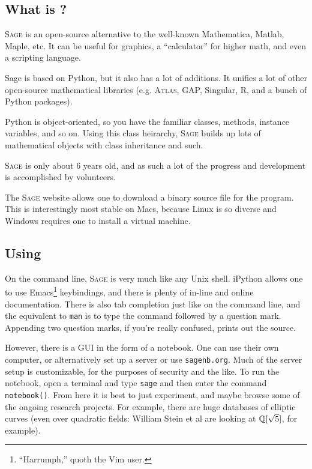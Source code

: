 \subsection{What is {}?}
\textsc{Sage} is an open-source alternative to the well-known Mathematica, Matlab, Maple, etc. It can be useful for graphics, a ``calculator'' for higher math, and even a scripting language.

Sage is based on Python, but it also has a lot of additions. It unifies a lot of other open-source mathematical libraries (e.g. \textsc{Atlas}, GAP, Singular, R, and a bunch of Python packages).

Python is object-oriented, so you have the familiar classes, methods, instance variables, and so on. Using this class heirarchy, \textsc{Sage} builds up lots of mathematical objects with class inheritance and such.

\textsc{Sage} is only about 6 years old, and as such a lot of the progress and development is accomplished by volunteers.

The \textsc{Sage} website allows one to download a binary source file for the program. This is interestingly most stable on Macs, because Linux is so diverse and Windows requires one to install a virtual machine.

\subsection{Using {}}
On the command line, \textsc{Sage} is very much like any Unix shell. iPython allows one to use Emacs\footnote{``Harrumph,'' quoth the Vim user.} keybindings, and there is plenty of in-line and online documentation. There is also tab completion just like on the command line, and the equivalent to \texttt{man} is to type the command followed by a question mark. Appending two question marks, if you're really confused, prints out the source.

However, there is a GUI in the form of a notebook. One can use their own computer, or alternatively set up a server or use \texttt{sagenb.org}. Much of the server setup is customizable, for the purposes of security and the like. To run the notebook, open a terminal and type \texttt{sage} and then enter the command \texttt{notebook()}. From here it is best to just experiment, and maybe browse some of the ongoing research projects. For example, there are huge databases of elliptic curves (even over quadratic fields: William Stein et al are looking at $\mathbb{Q}[\sqrt{5}]$, for example).

